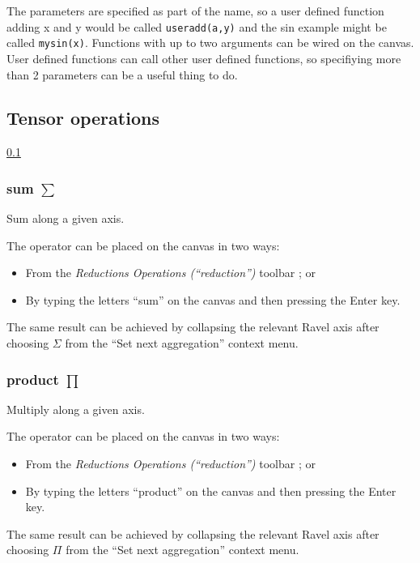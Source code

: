 The parameters are specified as part of the name, so a user defined
function adding x and y would be called \verb'useradd(a,y)' and the
sin example might be called \verb'mysin(x)'. Functions with up to two
arguments can be wired on the canvas. User defined functions can call
other user defined functions, so specifiying more than 2 parameters
can be a useful thing to do.

\subsection{Tensor operations}

\label{Operations: Reduction}\ref{Operations: Reduction}

\subsubsection{sum $\sum$}


\label{Operation:sum} Sum along a given axis.

The operator can be placed on the canvas in two ways:
\begin{itemize}
\item From the \emph{Reductions Operations (``reduction'')} toolbar ;
or 
\item By typing the letters ``sum'' on the canvas and then pressing the
Enter key.
\end{itemize}
The same result can be achieved by collapsing the relevant Ravel axis
after choosing $\Sigma$ from the ``Set next
aggregation'' context menu.

\subsubsection{product $\prod$}


\label{Operation:product} Multiply along a given axis.

The operator can be placed on the canvas in two ways:
\begin{itemize}
\item From the \emph{Reductions Operations (``reduction'')} toolbar ;
or 
\item By typing the letters ``product'' on the canvas and then pressing
the Enter key.
\end{itemize}
The same result can be achieved by collapsing the relevant Ravel axis
after choosing $\Pi$ from the ``Set next
aggregation'' context menu.

